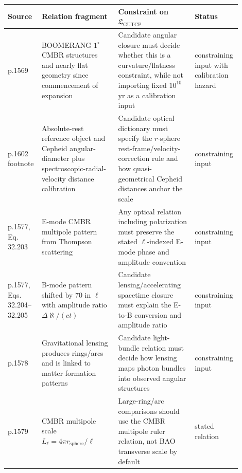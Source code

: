\documentclass[11pt]{article}
\begin{document}
\begingroup
\scriptsize
\setlength{\tabcolsep}{3pt}
\begin{longtable}{p{0.12\linewidth}p{0.32\linewidth}p{0.32\linewidth}p{0.14\linewidth}}
\toprule
Source & Relation fragment & Constraint on \(\mathfrak{L}_{\mathrm{GUTCP}}\) & Status\\
\midrule
\endhead
p.1569 & BOOMERANG \(1^\circ\) CMBR structures and nearly flat geometry since
commencement of expansion & Candidate angular closure must decide whether this
is a curvature/flatness constraint, while not importing fixed \(10^{10}\) yr as
a calibration input & constraining input with calibration hazard\\
\addlinespace
p.1602 footnote & Absolute-rest reference object and Cepheid angular-diameter
plus spectroscopic-radial-velocity distance calibration & Candidate optical
dictionary must specify the \(r\)-sphere rest-frame/velocity-correction rule
and how quasi-geometrical Cepheid distances anchor the scale & constraining
input\\
\addlinespace
p.1577, Eq. 32.203 & E-mode CMBR multipole pattern from Thompson scattering &
Any optical relation including polarization must preserve the stated
\(\ell\)-indexed E-mode phase and amplitude convention & constraining input\\
\addlinespace
p.1577, Eqs. 32.204--32.205 & B-mode pattern shifted by \(70\) in \(\ell\)
with amplitude ratio \(\Delta\aleph/(ct)\) & Candidate lensing/accelerating
spacetime closure must explain the E-to-B conversion and amplitude ratio &
constraining input\\
\addlinespace
p.1578 & Gravitational lensing produces rings/arcs and is linked to matter
formation patterns & Candidate light-bundle relation must decide how lensing
maps photon bundles into observed angular structures & constraining input\\
\addlinespace
p.1579 & CMBR multipole scale \(L_\ell=4\pi r_{\mathrm{sphere}}/\ell\) &
Large-ring/arc comparisons should use the CMBR multipole ruler relation, not
BAO transverse scale by default & stated relation\\
\bottomrule
\end{longtable}
\endgroup
\end{document}
